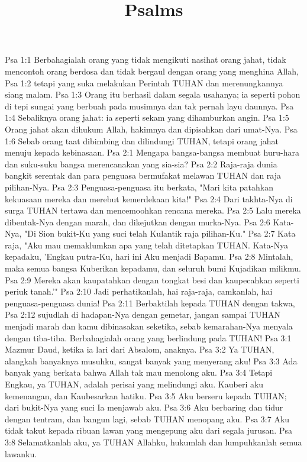 

\title{Psalms}

Psa 1:1  Berbahagialah orang yang tidak mengikuti nasihat orang jahat, tidak mencontoh orang berdosa dan tidak bergaul dengan orang yang menghina Allah,
Psa 1:2  tetapi yang suka melakukan Perintah TUHAN dan merenungkannya siang malam.
Psa 1:3  Orang itu berhasil dalam segala usahanya; ia seperti pohon di tepi sungai yang berbuah pada musimnya dan tak pernah layu daunnya.
Psa 1:4  Sebaliknya orang jahat: ia seperti sekam yang dihamburkan angin.
Psa 1:5  Orang jahat akan dihukum Allah, hakimnya dan dipisahkan dari umat-Nya.
Psa 1:6  Sebab orang taat dibimbing dan dilindungi TUHAN, tetapi orang jahat menuju kepada kebinasaan.
Psa 2:1  Mengapa bangsa-bangsa membuat huru-hara dan suku-suku bangsa merencanakan yang sia-sia?
Psa 2:2  Raja-raja dunia bangkit serentak dan para penguasa bermufakat melawan TUHAN dan raja pilihan-Nya.
Psa 2:3  Penguasa-penguasa itu berkata, "Mari kita patahkan kekuasaan mereka dan merebut kemerdekaan kita!"
Psa 2:4  Dari takhta-Nya di surga TUHAN tertawa dan mencemoohkan rencana mereka.
Psa 2:5  Lalu mereka dibentak-Nya dengan marah, dan dikejutkan dengan murka-Nya.
Psa 2:6  Kata-Nya, "Di Sion bukit-Ku yang suci telah Kulantik raja pilihan-Ku."
Psa 2:7  Kata raja, "Aku mau memaklumkan apa yang telah ditetapkan TUHAN. Kata-Nya kepadaku, 'Engkau putra-Ku, hari ini Aku menjadi Bapamu.
Psa 2:8  Mintalah, maka semua bangsa Kuberikan kepadamu, dan seluruh bumi Kujadikan milikmu.
Psa 2:9  Mereka akan kaupatahkan dengan tongkat besi dan kaupecahkan seperti periuk tanah.'"
Psa 2:10  Jadi perhatikanlah, hai raja-raja, camkanlah, hai penguasa-penguasa dunia!
Psa 2:11  Berbaktilah kepada TUHAN dengan takwa,
Psa 2:12  sujudlah di hadapan-Nya dengan gemetar, jangan sampai TUHAN menjadi marah dan kamu dibinasakan seketika, sebab kemarahan-Nya menyala dengan tiba-tiba. Berbahagialah orang yang berlindung pada TUHAN!
Psa 3:1  Mazmur Daud, ketika ia lari dari Absalom, anaknya.
Psa 3:2  Ya TUHAN, alangkah banyaknya musuhku, sangat banyak yang menyerang aku!
Psa 3:3  Ada banyak yang berkata bahwa Allah tak mau menolong aku.
Psa 3:4  Tetapi Engkau, ya TUHAN, adalah perisai yang melindungi aku. Kauberi aku kemenangan, dan Kaubesarkan hatiku.
Psa 3:5  Aku berseru kepada TUHAN; dari bukit-Nya yang suci Ia menjawab aku.
Psa 3:6  Aku berbaring dan tidur dengan tentram, dan bangun lagi, sebab TUHAN menopang aku.
Psa 3:7  Aku tidak takut kepada ribuan lawan yang mengepung aku dari segala jurusan.
Psa 3:8  Selamatkanlah aku, ya TUHAN Allahku, hukumlah dan lumpuhkanlah semua lawanku.

